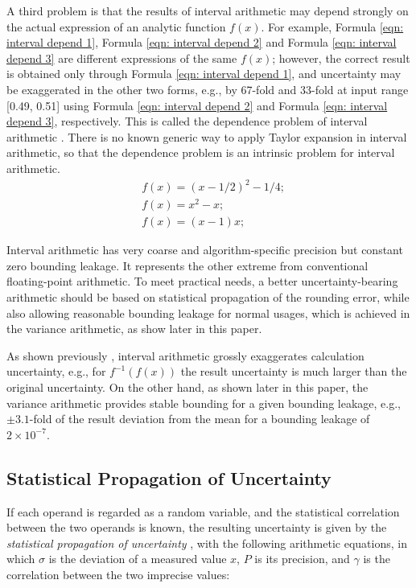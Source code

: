 \documentclass[twoside]{article}
\numberwithin{equation}{section}
\begin{document}
A third problem is that the results of interval arithmetic may depend strongly on the actual expression of an analytic function $f(x)$.  
For example, Formula \eqref{eqn: interval depend 1}, Formula \eqref{eqn: interval depend 2} and Formula \eqref{eqn: interval depend 3} are different expressions of the same $f(x)$; however, the correct result is obtained only through Formula \eqref{eqn: interval depend 1}, and uncertainty may be exaggerated in the other two forms, e.g., by 67-fold and 33-fold at input range [0.49, 0.51] using Formula \eqref{eqn: interval depend 2} and Formula \eqref{eqn: interval depend 3}, respectively.  
This is called the dependence problem of interval arithmetic \cite{Interval_Arithmetic}.  
There is no known generic way to apply Taylor expansion in interval arithmetic, so that the dependence problem is an intrinsic problem for interval arithmetic.
\begin{align}
\label{eqn: interval depend 1} & 
f(x) = (x - 1/2)^{2} - 1/4; \\
\label{eqn: interval depend 2} & 
f(x) = x^{2} - x; \\
\label{eqn: interval depend 3} & 
f(x) = (x - 1) x;
\end{align}

Interval arithmetic has very coarse and algorithm-specific precision but constant zero bounding leakage.  
It represents the other extreme from conventional floating-point arithmetic.  
To meet practical needs, a better uncertainty-bearing arithmetic should be based on statistical propagation of the rounding error, while also allowing reasonable bounding leakage for normal usages, which is achieved in the variance arithmetic, as show later in this paper.

As shown previously \cite{Prev_Precision_Arithmetic}, interval arithmetic grossly exaggerates calculation uncertainty, e.g., for $f^{-1}(f(x))$ the result uncertainty is much larger than the original uncertainty.
On the other hand, as shown later in this paper, the variance arithmetic provides stable bounding for a given bounding leakage, e.g., $\pm 3.1$-fold of the result deviation from the mean for a bounding leakage of $2 \times 10^{-7}$.


\subsection{Statistical Propagation of Uncertainty}

If each operand is regarded as a random variable, and the statistical correlation between the two operands is known, the resulting uncertainty is given by the \emph{statistical propagation of uncertainty} \cite{Statistical_Arithmetic}\cite{Statistical_Analysis}, with the following arithmetic equations, in which $\sigma$ is the deviation of a measured value $x$, $P$ is its precision, and $\gamma$ is the correlation between the two imprecise values:
\end{document}
